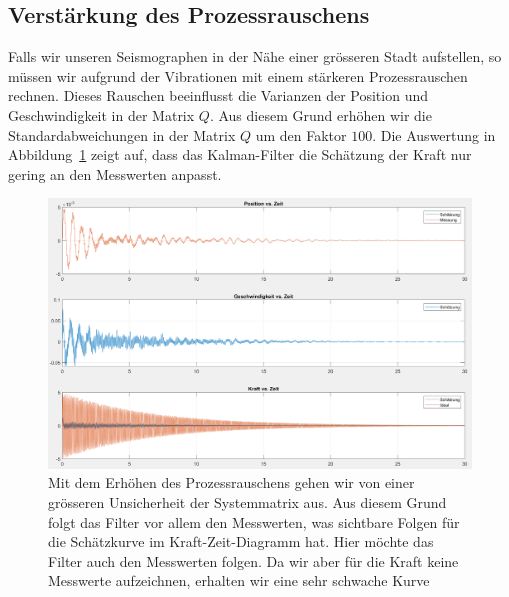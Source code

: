 \subsection{Verstärkung des Prozessrauschens}
Falls wir unseren Seismographen in der Nähe einer grösseren Stadt aufstellen, so müssen wir aufgrund der Vibrationen mit einem stärkeren Prozessrauschen rechnen.
Dieses Rauschen beeinflusst die Varianzen der Position und Geschwindigkeit in der Matrix $Q$.
Aus diesem Grund erhöhen wir die Standardabweichungen in der Matrix $Q$ um den Faktor $100$.
Die Auswertung in Abbildung~\ref{erdbeben:fig:prozessrauschen-geaendert} zeigt auf, dass das Kalman-Filter die Schätzung der Kraft nur gering an den Messwerten anpasst.

\begin{figure}
	\begin{center}
		\includegraphics[width=\linewidth,keepaspectratio]{papers/erdbeben/Prozessrauschen_geaendert.PNG}
		\caption{Mit dem Erhöhen des Prozessrauschens gehen wir von einer grösseren Unsicherheit der Systemmatrix aus. Aus diesem Grund folgt das Filter vor allem den Messwerten, was sichtbare Folgen für die Schätzkurve im Kraft-Zeit-Diagramm hat. Hier möchte das Filter auch den Messwerten folgen. Da wir aber für die Kraft keine Messwerte aufzeichnen, erhalten wir eine sehr schwache Kurve}
    \label{erdbeben:fig:prozessrauschen-geaendert}
	\end{center}
\end{figure}

